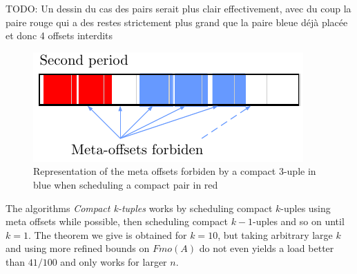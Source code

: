 \documentclass[10pt, conference, letterpaper]{IEEEtran}
\newcommand{\todo}[1]{{\color{red} TODO: {#1}}}
\begin{document}
\todo{Un dessin du cas des pairs serait plus clair effectivement, avec du coup la paire rouge qui a des restes strictement
plus grand que la paire bleue déjà placée et donc 4 offsets interdits}
\begin{figure}
\begin{center}

\includegraphics[scale=0.7]{forbiden}
\end{center}
\label{fig:forbidenmeta}
\caption{Representation of the meta offsets forbiden by a compact $3$-uple in blue when scheduling a compact pair in red} 
\end{figure}


The algorithms \emph{Compact k-tuples} works by scheduling compact $k$-uples
using meta offsets while possible, then scheduling compact $k-1$-uples and so on until $k=1$.
The theorem we give is obtained for $k=10$, but taking arbitrary large $k$ and using more refined bounds on $Fmo(A)$ do not even yields a load better than $41/100$ and only works for larger $n$.
\end{document}
